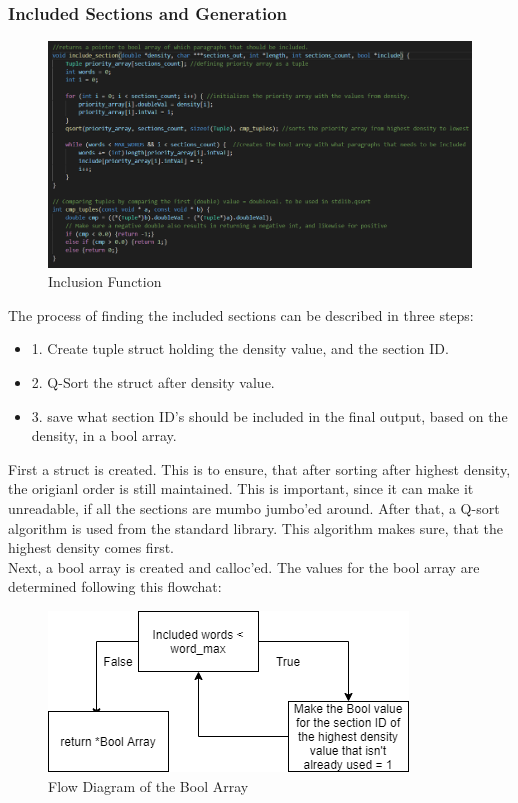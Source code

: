 \subsubsection{Included Sections and Generation}
\begin{figure}[H]
  \centering
  \includegraphics[scale = 0.6]{figures/includefunction.png}
  \caption{Inclusion Function}
\end{figure}
The process of finding the included sections can be described in three steps:
\begin{itemize}
  \item 1. Create tuple struct holding the density value, and the section ID.
  \item 2. Q-Sort the struct after density value.
  \item 3. save what section ID's should be included in the final output, based on the density, in a bool array.
\end{itemize}
First a struct is created. This is to ensure, that after sorting after highest density, the origianl order is still maintained.
This is important, since it can make it unreadable, if all the sections are mumbo jumbo'ed around.
After that, a Q-sort algorithm is used from the standard library. This algorithm makes sure, that the highest density comes first.
\\
Next, a bool array is created and calloc'ed. The values for the bool array are determined following this flowchat:
\begin{figure}[H]
  \centering
  \includegraphics[scale = 0.6]{figures/include_flow.png}
  \caption{Flow Diagram of the Bool Array}
\end{figure} 
